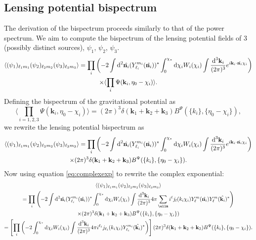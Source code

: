 \documentclass[11pt]{article} %
\DeclareRobustCommand{\d}{\ifmmode\text{d}\else d\fi}
\newcommand{\br}[1]{\ensuremath{\left( #1 \right)}}
\newcommand{\sbr}[1]{\ensuremath{\left[ #1 \right]}}
\begin{document}
\subsection{Lensing potential bispectrum}
The derivation of the bispectrum proceeds similarly to that of the power spectrum. We aim to compute the bispectrum of the lensing potential fields of 3 (possibly distinct sources), $\psi_1$, $\psi_2$, $\psi_3$. 
\begin{gather*}
    \langle (\psi_1)_{\ell_1m_1}(\psi_2)_{\ell_2m_2}(\psi_3)_{\ell_3m_3} \rangle = 
    \prod_i\br{-2\int\d^2\hat{\mathbf n_i}(Y^{m_i}_{\ell_i}(\hat{\mathbf n_i}))^*\int_0^{\chi_*}\d\chi_i W_i(\chi_i)\int\frac{\d^3\mathbf k_i}{(2\pi)^{3}}e^{i\mathbf k_i \cdot\hat{\mathbf n_i}\chi_i}} \\
    \times \langle \prod_i\Psi(\mathbf k_i, \eta_0 - \chi_i) \rangle.
\end{gather*}
Defining the bispectrum of the gravitational potential as
\begin{equation*}
    \langle \prod_{i=1,2,3}\Psi(\mathbf k_i, \eta_0 - \chi_i) \rangle = (2\pi)^3\delta(\mathbf k_1 + \mathbf k_2 + \mathbf k_3)B^\Psi(\{k_i\}, \{\eta_0-\chi_i\}),
\end{equation*}
we rewrite the lensing potential bispectrum as
\begin{gather*}
    \langle (\psi_1)_{\ell_1m_1}(\psi_2)_{\ell_2m_2}(\psi_3)_{\ell_3m_3} \rangle = 
    \prod_i\br{-2\int\d^2\hat{\mathbf n_i}(Y^{m_i}_{\ell_i}(\hat{\mathbf n_i}))^*\int_0^{\chi_*}\d\chi_i W_i(\chi_i)\int\frac{\d^3\mathbf k_i}{(2\pi)^{3}}e^{i\mathbf k_i \cdot\hat{\mathbf n_i}\chi_i}}\\ \times (2\pi)^3\delta(\mathbf k_1 + \mathbf k_2 + \mathbf k_3)B^\Psi(\{k_i\}, \{\eta_0-\chi_i\}).
\end{gather*}
Now using equation \ref{eq:complexexp} to rewrite the complex exponential:
\begin{gather*}
    \langle (\psi_1)_{\ell_1m_1}(\psi_2)_{\ell_2m_2}(\psi_3)_{\ell_3m_3} \rangle \\ = 
    \prod_i\br{-2\int\d^2\hat{\mathbf n_i}(Y^{m_i}_{\ell_i}(\hat{\mathbf n_i}))^*\int_0^{\chi_*}\d\chi_i W_i(\chi_i)\int\frac{\d^3\mathbf k_i}{(2\pi)^{3}}4\pi\sum_{\ellm}i^{\ell}j_{l}(k_i\chi_i)Y_{\ell}^{m}(\hat{\mathbf n_i})Y_{\ell}^{m}(\hat{\mathbf k_i})^*}\\
    \times (2\pi)^3\delta(\mathbf k_1 + \mathbf k_2 + \mathbf k_3)B^\Psi(\{k_i\}, \{\eta_0-\chi_i\}) \\
    = \sbr{\prod_i\br{-2\int_0^{\chi_*}\d\chi_i W_i(\chi_i)\int\frac{\d^3\mathbf k_i}{(2\pi)^{3}}4\pi i^{\ell_i}j_{\ell_i}(k_i\chi_i)Y_{\ell_i}^{m_i}(\hat{\mathbf k_i})^*}} (2\pi)^3\delta(\mathbf k_1 + \mathbf k_2 + \mathbf k_3)B^\Psi(\{k_i\}, \{\eta_0-\chi_i\}).
\end{gather*}
\end{document}
